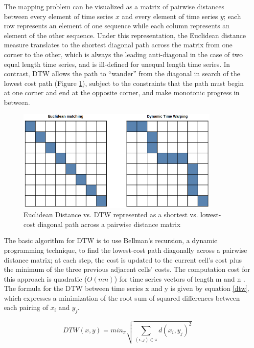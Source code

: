 \documentclass[12pt, letterpaper]{article}
\begin{document}
The mapping problem can be visualized as a matrix of pairwise distances between
every element of time series $x$ and every element of time series $y$; each row
represents an element of one sequence while each column represents an element of
the other sequence. Under this representation, the Euclidean distance measure
translates to the shortest diagonal path across the matrix from one corner to
the other, which is always the leading anti-diagonal in the case of two equal
length time series, and is ill-defined for unequal length time series. In
contrast, DTW allows the path to ``wander'' from the diagonal in search of the
lowest cost path (Figure \ref{euclidean_matrix}), subject to the constraints
that the path must begin at one corner and end at the opposite corner, and make
monotonic progress in between.

\begin{figure}[htbp]
\includegraphics[height=2in]{img/euclidean_dtw_matrix.png}
\centering
\caption{Euclidean Distance vs. DTW represented as a shortest
  vs. lowest-cost diagonal path across a pairwise distance matrix}
\label{euclidean_matrix}
\end{figure}

The basic algorithm for DTW is to use Bellman's recursion, a dynamic programming
technique, to find the lowest-cost path diagonally across a pairwise distance
matrix; at each step, the cost is updated to the current cell's cost plus the
minimum of the three previous adjacent cells' costs. The computation cost for
this approach is quadratic ($O(mn)$) for time series vectors of length m and n
\cite{cuturi_soft-dtw_2018}. The formula for the DTW between time series x and y
is given by equation \ref{dtw}, which expresses a minimization of the root sum
of squared differences between each pairing of $x_{i}$ and $y_{j}$.

\begin{equation} \label{dtw}
DTW(x,y) = min_{\pi}\sqrt{\sum_{(i,j)\in\pi}d(x_{i},y_{j})^2}
\end{equation}
\end{document}
